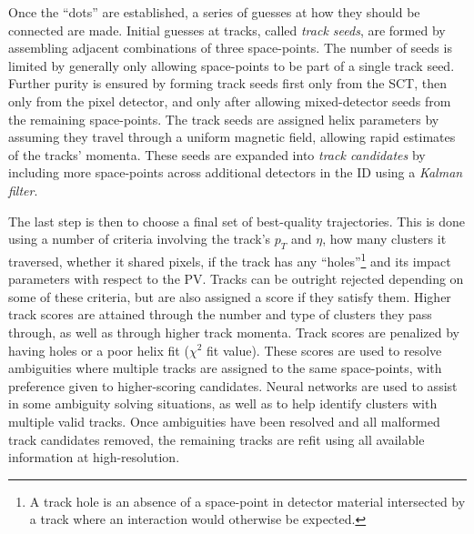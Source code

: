             Once the ``dots'' are established, a series of guesses at how they should be connected are made.
            Initial guesses at tracks, called \textit{track seeds}, are formed by assembling adjacent combinations of three space-points.
            The number of seeds is limited by generally only allowing space-points to be part of a single track seed.
            Further purity is ensured by forming track seeds first only from the SCT, then only from the pixel detector,
                and only after allowing mixed-detector seeds from the remaining space-points.
            The track seeds are assigned helix parameters by assuming they travel through a uniform magnetic field,
                allowing rapid estimates of the tracks' momenta.
            These seeds are expanded into \textit{track candidates}
                by including more space-points across additional detectors in the ID using a \textit{Kalman filter}.

            The last step is then to choose a final set of best-quality trajectories.
            This is done using a number of criteria involving
                the track's $p_T$ and $\eta$,
                how many clusters it traversed, 
                whether it shared pixels,
                if the track has any ``holes''\footnote{
                    A track hole is an absence of a space-point in detector material intersected by a track
                    where an interaction would otherwise be expected.}
                and its impact parameters with respect to the PV\cite{atlas_track_reco_performance}.
            Tracks can be outright rejected depending on some of these criteria,
                but are also assigned a score if they satisfy them.
            Higher track scores are attained through the number and type of clusters they pass through,
                as well as through higher track momenta.
            Track scores are penalized by having holes or a poor helix fit ($\chi^2$ fit value).
            These scores are used to resolve ambiguities where multiple tracks are assigned to the same space-points,
                with preference given to higher-scoring candidates.
            Neural networks are used to assist in some ambiguity solving situations,
                as well as to help identify clusters with multiple valid tracks.
            Once ambiguities have been resolved and all malformed track candidates removed,
                the remaining tracks are refit using all available information at high-resolution\cite{atlas_track_reco_performance}.

